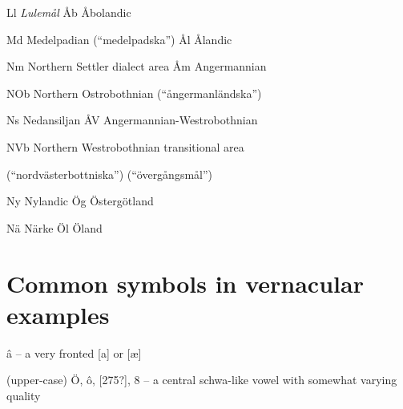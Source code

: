 Ll  \textit{Lulemål}  Åb  Åbolandic


Md  Medelpadian (“medelpadska”)  Ål  Ålandic


Nm  Northern Settler dialect area  Åm  Angermannian


NOb  Northern Ostrobothnian    (“ångermanländska”)


Ns  Nedansiljan  ÅV  Angermannian-Westrobothnian


NVb  Northern Westrobothnian    transitional area


  (“nordvästerbottniska”)    (“övergångsmål”)


Ny  Nylandic  Ög  Östergötland


Nä  Närke  Öl  Öland


\section[Common symbols in vernacular examples]{\rmfamily Common symbols in vernacular examples}
\label{bkm:Ref224104485}%
â – a very fronted [a] or [æ]


(upper-case) Ö, ô, [275?], \textsc{8  }\textsc{–}\textsc{ }a central schwa-like vowel with somewhat varying quality

